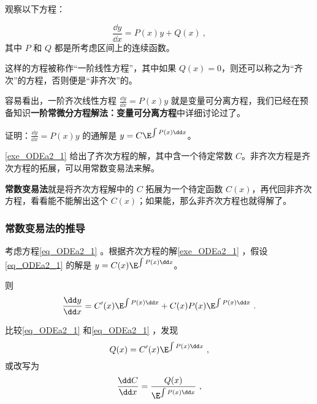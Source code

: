 

观察以下方程：

\begin{equation}\label{eq_ODEa2_1}
\frac{\dd y}{\dd x}=P(x)y+Q(x)~,
\end{equation}
其中 $P$ 和 $Q$ 都是所考虑区间上的连续函数。

这样的方程被称作“一阶线性方程”，其中如果 $Q(x)=0$，则还可以称之为“齐次”的方程，否则便是“非齐次”的。

容易看出，一阶齐次线性方程 $\frac{\dd y}{\dd x}=P(x)y$ 就是变量可分离方程，我们已经在预备知识\textbf{一阶常微分方程解法：变量可分离方程}中详细讨论过了。

\begin{exercise}{}\label{exe_ODEa2_1}
证明：$\frac{\dd y}{\dd x}=P(x)y$ 的通解是 $y=C\E^{\int P(x)\dd x}$。
\end{exercise}

\autoref{exe_ODEa2_1} 给出了齐次方程的解，其中含一个待定常数 $C$。非齐次方程是齐次方程的拓展，可以用常数变易法来解。

\textbf{常数变易法}就是将齐次方程解中的 $C$ 拓展为一个待定函数 $C(x)$，再代回非齐次方程，看看能不能解出这个 $C(x)$；如果能，那么非齐次方程也就得解了。

\subsubsection{常数变易法的推导}
考虑方程\autoref{eq_ODEa2_1} 。根据齐次方程的解\autoref{exe_ODEa2_1} ，假设\autoref{eq_ODEa2_1} 的解是 $y=C(x)\E^{\int P(x)\dd x}$。

则
\begin{equation}
\begin{aligned}
\frac{\dd y}{\dd x}=C'(x)\E^{\int P(x)\dd x}+C(x)P(x)\E^{\int P(x)\dd x}~.
\end{aligned}
\end{equation}

比较\autoref{eq_ODEa2_1} 和\autoref{eq_ODEa2_1} ，发现
\begin{equation}
Q(x)=C'(x)\E^{\int P(x)\dd x}~,
\end{equation}
或改写为
\begin{equation}
\frac{\dd C}{\dd x}=\frac{Q(x)}{\E^{\int P(x)\dd x}}~,
\end{equation}

